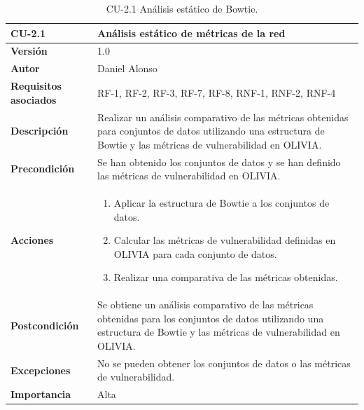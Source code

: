 \begin{table}[p]
	\centering
	\begin{tabularx}{\linewidth}{ p{} p{} }
		\toprule
		\textbf{CU-2.1}               & \textbf{Análisis estático de métricas de la red}                                         \\
		\toprule
		\textbf{Versión}              & 1.0                                                                           \\
		\textbf{Autor}                & Daniel Alonso                                                                 \\
		\textbf{Requisitos asociados} & RF-1, RF-2, RF-3, RF-7, RF-8, RNF-1, RNF-2, RNF-4                             \\
		\textbf{Descripción}          & Realizar un análisis comparativo de las métricas
		obtenidas para conjuntos de datos utilizando una estructura de Bowtie y las métricas
		de vulnerabilidad en OLIVIA.                                                                                  \\
		\textbf{Precondición}         & Se han obtenido los conjuntos de datos y se han definido
		las métricas de vulnerabilidad en OLIVIA.                                                                     \\
		\textbf{Acciones}             &
		\begin{enumerate}
			\def\labelenumi{\arabic{enumi}.}
			\tightlist
			\item Aplicar la estructura de Bowtie a los conjuntos de datos.
			\item Calcular las métricas de vulnerabilidad definidas en OLIVIA para cada conjunto de datos.
			\item Realizar una comparativa de las métricas obtenidas.
		\end{enumerate}                 \\
		\textbf{Postcondición}        & Se obtiene un análisis comparativo de las métricas obtenidas
		para los conjuntos de datos utilizando una estructura de Bowtie y las métricas de
		vulnerabilidad en OLIVIA.                                                                                     \\
		\textbf{Excepciones}          & No se pueden obtener los conjuntos de datos o las métricas de vulnerabilidad. \\
		\textbf{Importancia}          & Alta                                                                          \\
		\bottomrule
	\end{tabularx}
	\caption{CU-2.1 Análisis estático de Bowtie.}
	\label{tab:cu2.1}
\end{table}

